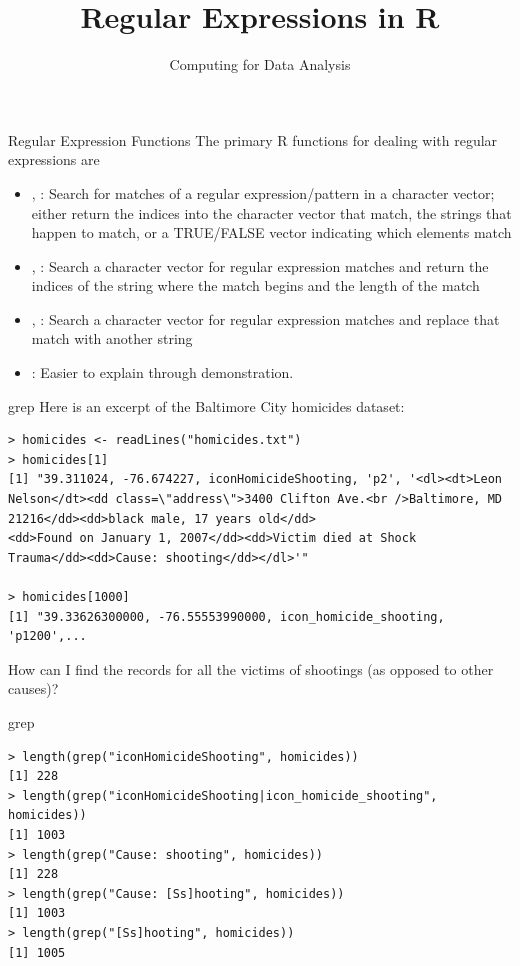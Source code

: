 \documentclass[aspectratio=169]{beamer}
\title[Regular Expressions in R]{Regular Expressions in R}
\date{Computing for Data Analysis}
\begin{document}
\begin{frame}
  \titlepage
\end{frame}

\begin{frame}{Regular Expression Functions}
The primary R functions for dealing with regular expressions are
\begin{itemize}
\item {}, : Search for matches of a regular
  expression/pattern in a character vector; either return the indices
  into the character vector that match, the strings that happen to
  match, or a TRUE/FALSE vector indicating which elements match
\item {}, : Search a character vector for regular
  expression matches and return the indices of the string where the
  match begins and the length of the match
\item {}, : Search a character vector for regular
  expression matches and replace that match with another string
\item {}: Easier to explain through demonstration.
\end{itemize}
\end{frame}

\begin{frame}[fragile]{grep}
Here is an excerpt of the Baltimore City homicides dataset:
\begin{verbatim}
> homicides <- readLines("homicides.txt")
> homicides[1]
[1] "39.311024, -76.674227, iconHomicideShooting, 'p2', '<dl><dt>Leon 
Nelson</dt><dd class=\"address\">3400 Clifton Ave.<br />Baltimore, MD 
21216</dd><dd>black male, 17 years old</dd>
<dd>Found on January 1, 2007</dd><dd>Victim died at Shock 
Trauma</dd><dd>Cause: shooting</dd></dl>'"

> homicides[1000]
[1] "39.33626300000, -76.55553990000, icon_homicide_shooting, 'p1200',...
\end{verbatim}
How can I find the records for all the victims of shootings (as
opposed to other causes)?
\end{frame}

\begin{frame}[fragile]{grep}

\begin{verbatim}
> length(grep("iconHomicideShooting", homicides))
[1] 228
> length(grep("iconHomicideShooting|icon_homicide_shooting", homicides))
[1] 1003
> length(grep("Cause: shooting", homicides))
[1] 228
> length(grep("Cause: [Ss]hooting", homicides))
[1] 1003
> length(grep("[Ss]hooting", homicides))
[1] 1005
\end{verbatim}

\end{frame}
\end{document}

